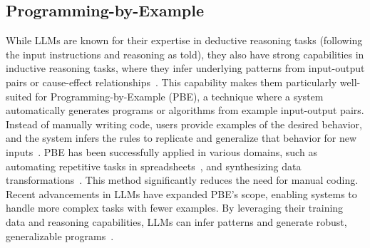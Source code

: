 \subsection{Programming-by-Example}
While LLMs are known for their expertise in deductive reasoning tasks (following the input instructions and reasoning as told), they also have strong capabilities in inductive reasoning tasks, where they infer underlying patterns from input-output pairs or cause-effect relationships~\cite{cheng2024inductive}. This capability makes them particularly well-suited for Programming-by-Example (PBE), a technique where a system automatically generates programs or algorithms from example input-output pairs. Instead of manually writing code, users provide examples of the desired behavior, and the system infers the rules to replicate and generalize that behavior for new inputs~\cite{gulwani2017program,halbert1984programming}.
PBE has been successfully applied in various domains, such as automating repetitive tasks in spreadsheets~\cite{wu2023programming}, and synthesizing data transformations~\cite{jin2017foofah,feser2015synthesizing}. This method significantly reduces the need for manual coding. 
Recent advancements in LLMs have expanded PBE's scope, enabling systems to handle more complex tasks with fewer examples. By leveraging their training data and reasoning capabilities, LLMs can infer patterns and generate robust, generalizable programs~\cite{cheng2024inductive}.
